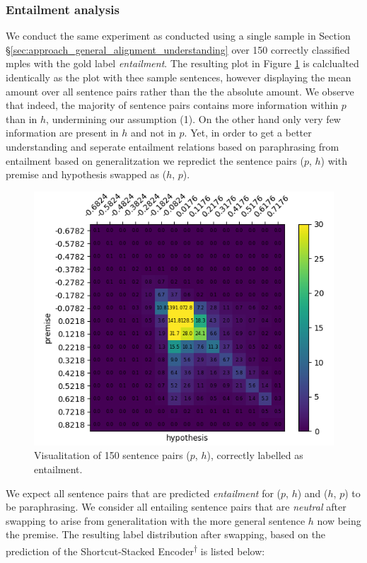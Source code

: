 \subsubsection{Entailment analysis}
We conduct the same experiment as conducted using a single sample in Section §\ref{sec:approach_general_alignment_understanding} over 150 correctly classified mples with the gold label \textit{entailment}. The resulting plot in Figure \ref{fig:entailment_uninversed} is calclualted identically as the plot with thee sample sentences, however displaying the mean amount over all sentence pairs rather than the the absolute amount. We observe that indeed, the majority of sentence pairs contains more information within $p$ than in $h$, undermining our  assumption (1). On the other hand only very few information are present in $h$ and not in $p$. Yet, in order to get a better understanding and seperate entailment relations based on paraphrasing from entailment based on generalitzation we repredict the sentence pairs ($p$, $h$) with premise and hypothesis swapped as ($h$, $p$). 
\begin{figure}[tph!]	\centering
\includegraphics[totalheight=6.5cm]{fig/entailment_uninversed.png}
	\caption{Visualitation of 150 sentence pairs ($p$, $h$), correctly labelled as entailment.}
	\label{fig:entailment_uninversed}
\end{figure}
We expect all sentence pairs that are predicted \textit{entailment} for ($p$, $h$) and ($h$, $p$) to be paraphrasing. We consider all entailing sentence pairs that are \textit{neutral} after swapping to arise from generalitation with the more general sentence $h$ now being the premise. The resulting label distribution after swapping, based on the prediction of the Shortcut-Stacked Encoder\textsuperscript{$\dagger$} is listed below:
